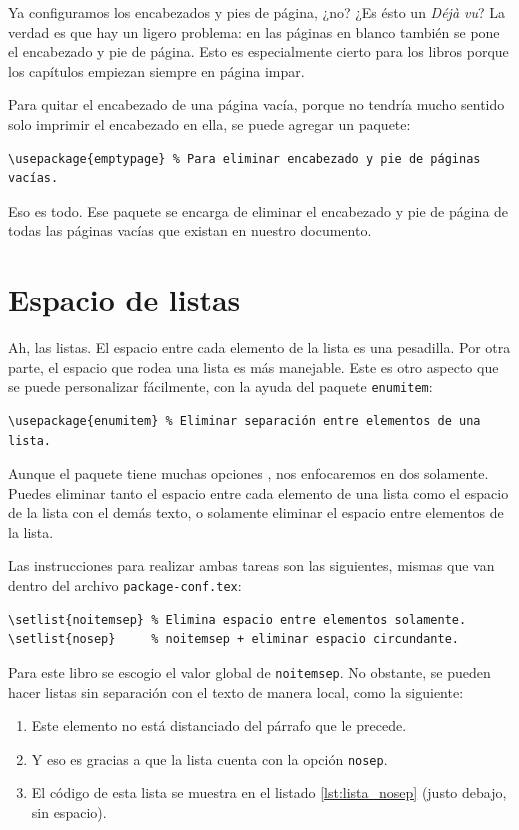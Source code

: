 Ya configuramos los encabezados y pies de página, ¿no? ¿Es ésto un \emph{Déjà vu}? La verdad es que hay un ligero problema: en las páginas en blanco también se pone el encabezado y pie de página. Esto es especialmente cierto para los libros porque los capítulos empiezan siempre en página impar.

Para quitar el encabezado de una página vacía, porque no tendría mucho sentido solo imprimir el encabezado en ella, se puede agregar un paquete:

\begin{lstlisting}[style=latex]
\usepackage{emptypage} % Para eliminar encabezado y pie de páginas vacías.
\end{lstlisting}

Eso es todo. Ese paquete se encarga de eliminar el encabezado y pie de página de todas las páginas vacías que existan en nuestro documento.



\section{Espacio de listas}
\label{sec:espacio_de_listas}



Ah, las listas. El espacio entre cada elemento de la lista es una pesadilla. Por otra parte, el espacio que rodea una lista es más manejable. Este es otro aspecto que se puede personalizar fácilmente, con la ayuda del paquete \texttt{enumitem}:

\begin{lstlisting}[style=latex]
\usepackage{enumitem} % Eliminar separación entre elementos de una lista.
\end{lstlisting}

Aunque el paquete tiene muchas opciones \cite{bib:enumitem}, nos enfocaremos en dos solamente. Puedes eliminar tanto el espacio entre cada elemento de una lista como el espacio de la lista con el demás texto, o solamente eliminar el espacio entre elementos de la lista.

Las instrucciones para realizar ambas tareas son las siguientes, mismas que van dentro del archivo \texttt{package-conf.tex}:

\begin{lstlisting}[style=latex]
\setlist{noitemsep} % Elimina espacio entre elementos solamente.
\setlist{nosep}     % noitemsep + eliminar espacio circundante.
\end{lstlisting}

Para este libro se escogio el valor global de \texttt{noitemsep}. No obstante, se pueden hacer listas sin separación con el texto de manera local, como la siguiente:
\begin{enumerate}[nosep]
	\item Este elemento no está distanciado del párrafo que le precede.
	\item Y eso es gracias a que la lista cuenta con la opción \texttt{nosep}.
	\item El código de esta lista se muestra en el listado \ref{lst:lista_nosep} (justo debajo, sin espacio).
\end{enumerate}

